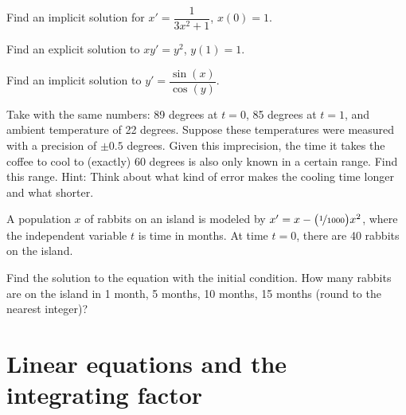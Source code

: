 \begin{exercise}
Find an implicit solution for
$x'=\dfrac{1}{3x^2+1}$, $x(0)=1$.
\end{exercise}

\begin{exercise}
Find an explicit solution to $x y' = y^2$, $y(1) = 1$.
\end{exercise}

\begin{exercise}
Find an implicit solution to $y' = \dfrac{\sin(x)}{\cos(y)}$.
\end{exercise}

\begin{exercise}
Take  with the same numbers: 89 degrees at
$t=0$, 85 degrees at $t=1$, and ambient temperature
of 22 degrees.  Suppose these temperatures were measured with a precision of
$\pm 0.5$ degrees.  Given this imprecision, the time
it takes the coffee to cool to (exactly) 60 degrees is also only known in a
certain range.  Find this range.  Hint: Think about what kind of error makes
the cooling time longer and what shorter.
\end{exercise}

\begin{exercise}
A population $x$ of rabbits on an island is modeled by
$x' = x- \bigl(\nicefrac{1}{1000} \bigr) x^2$, where the independent
variable $t$ is time in months.  At time $t=0$, there are 40 rabbits
on the island.
\begin{tasks}
\task Find the solution to the equation with the initial
condition.
\task
How many rabbits are on the island in 1 month, 5 months,
10 months, 15 months (round to the nearest integer)?
\end{tasks}
\end{exercise}


\sectionnewpage
\section{Linear equations and the integrating factor}
\label{intfactor:section}

